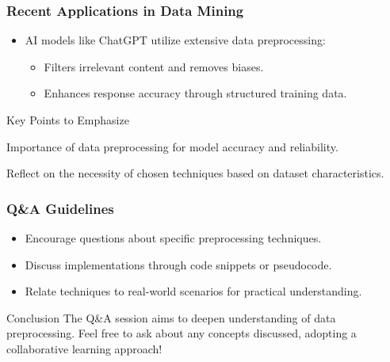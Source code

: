 \documentclass[aspectratio=169]{beamer}
\begin{document}
\begin{frame}[fragile]
    \frametitle{Recent Applications in Data Mining}
    \begin{itemize}
        \item AI models like ChatGPT utilize extensive data preprocessing:
            \begin{itemize}
                \item Filters irrelevant content and removes biases.
                \item Enhances response accuracy through structured training data.
            \end{itemize}
    \end{itemize}
    
    \begin{block}{Key Points to Emphasize}
        \item Importance of data preprocessing for model accuracy and reliability.
        \item Reflect on the necessity of chosen techniques based on dataset characteristics.
    \end{block}
\end{frame}

\begin{frame}[fragile]
    \frametitle{Q\&A Guidelines}
    \begin{itemize}
        \item Encourage questions about specific preprocessing techniques.
        \item Discuss implementations through code snippets or pseudocode.
        \item Relate techniques to real-world scenarios for practical understanding.
    \end{itemize}
    
    \begin{block}{Conclusion}
        The Q\&A session aims to deepen understanding of data preprocessing. Feel free to ask about any concepts discussed, adopting a collaborative learning approach!
    \end{block}
\end{frame}
\end{document}
